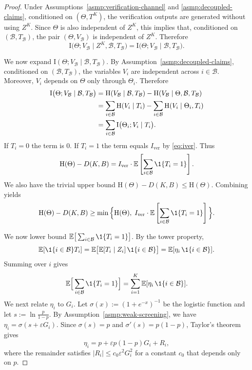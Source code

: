\documentclass[twocolumn]{scholar7}
\newcommand{\cB}{\mathcal{B}}
\newcommand{\E}{\mathbb{E}}
\newcommand{\I}{\mathrm{I}}
\newcommand{\Hh}{\mathrm{H}}
\newcommand{\abs}[1]{\left|#1\right|}
\newcommand{\bracks}[1]{\left[#1\right]}
\begin{document}
\begin{appendix}
\begin{proof}
Under Assumptions~\ref{asmp:verification-channel} and \ref{asmp:decoupled-claims}, conditioned on $(\Theta,T^K)$,
the verification outputs are generated without using $Z^K$.
Since $\Theta$ is also independent of $Z^K$, this implies that, conditioned on $(\cB,T_{\cB})$,
the pair $(\Theta,V_{\cB})$ is independent of $Z^K$.
Therefore
\[
\I\big(\Theta;V_{\cB}\mid Z^K,\cB,T_{\cB}\big)
=
\I\big(\Theta;V_{\cB}\mid \cB,T_{\cB}\big).
\]

We now expand $\I(\Theta;V_{\cB}\mid \cB,T_{\cB})$.
By Assumption~\ref{asmp:decoupled-claims}, conditioned on $(\cB,T_{\cB})$, the variables $V_i$ are independent across $i\in\cB$.
Moreover, $V_i$ depends on $\Theta$ only through $\Theta_i$.
Therefore
\begin{align}
\I\big(\Theta;V_{\cB}\mid \cB,T_{\cB}\big)
&=\Hh(V_{\cB}\mid \cB,T_{\cB})-\Hh(V_{\cB}\mid \Theta,\cB,T_{\cB})\notag\\
&=\sum_{i\in\cB}\Hh(V_i\mid T_i)-\sum_{i\in\cB}\Hh(V_i\mid \Theta_i,T_i)\notag\\
&=\sum_{i\in\cB}\I\big(\Theta_i;V_i\mid T_i\big).
\end{align}
If $T_i=0$ the term is $0$.
If $T_i=1$ the term equals $I_{\mathrm{ver}}$ by \eqref{eq:iver}.
Thus
\begin{equation}
\label{eq:gain-Iver-app}
\Hh(\Theta)-D(K,B)=I_{\mathrm{ver}}\cdot \E\bracks{\sum_{i\in\cB}\1\{T_i=1\}}.
\end{equation}
We also have the trivial upper bound $\Hh(\Theta)-D(K,B)\le \Hh(\Theta)$.
Combining yields
\begin{equation}
\label{eq:gain-min-app}
\Hh(\Theta)-D(K,B)
\ge
\min\Big\{\Hh(\Theta),\;I_{\mathrm{ver}}\cdot \E\bracks{\sum_{i\in\cB}\1\{T_i=1\}}\Big\}.
\end{equation}

We now lower bound $\E\big[\sum_{i\in\cB}\1\{T_i=1\}\big]$.
By the tower property,
\[
\E[\1\{i\in\cB\}T_i]=\E\big[\E[T_i\mid Z_i]\,\1\{i\in\cB\}\big]=\E[\eta_i\,\1\{i\in\cB\}].
\]
Summing over $i$ gives
\[
\E\Big[\sum_{i\in\cB}\1\{T_i=1\}\Big]=\sum_{i=1}^K \E[\eta_i\,\1\{i\in\cB\}].
\]
We next relate $\eta_i$ to $G_i$.
Let $\sigma(x):=(1+e^{-x})^{-1}$ be the logistic function and let $s:=\ln\frac{p}{1-p}$.
By Assumption~\ref{asmp:weak-screening}, we have $\eta_i=\sigma(s+\varepsilon G_i)$.
Since $\sigma(s)=p$ and $\sigma'(s)=p(1-p)$, Taylor's theorem gives
\[
\eta_i
=
p+\varepsilon p(1-p)G_i+R_i,
\]
where the remainder satisfies $\abs{R_i}\le c_0\varepsilon^2 G_i^2$ for a constant $c_0$ that depends only on $p$.


\end{proof}
\end{appendix}
\end{document}
